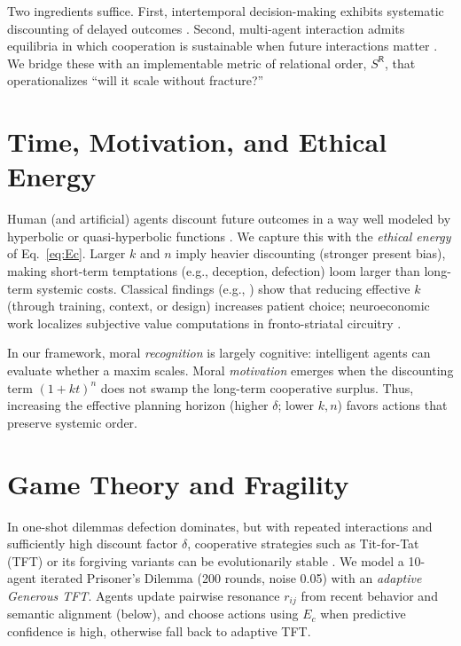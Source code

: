\documentclass[11pt]{article}
\begin{document}
Two ingredients suffice. First, intertemporal decision-making exhibits systematic discounting of delayed outcomes \cite{Ainslie1975,Frederick2002,KableGlimcher2007}. Second, multi-agent interaction admits equilibria in which cooperation is sustainable when future interactions matter \cite{Axelrod1984,Nowak2006,MaynardSmith1982}. We bridge these with an implementable metric of relational order, $S^{\mathsf{R}}$, that operationalizes ``will it scale without fracture?''

\section{Time, Motivation, and Ethical Energy}
Human (and artificial) agents discount future outcomes in a way well modeled by hyperbolic or quasi-hyperbolic functions \cite{Ainslie1975,Frederick2002}. We capture this with the \emph{ethical energy} of Eq.~\ref{eq:Ec}. Larger $k$ and $n$ imply heavier discounting (stronger present bias), making short-term temptations (e.g., deception, defection) loom larger than long-term systemic costs. Classical findings (e.g., \cite{Mischel1989}) show that reducing effective $k$ (through training, context, or design) increases patient choice; neuroeconomic work localizes subjective value computations in fronto-striatal circuitry \cite{KableGlimcher2007}.

In our framework, moral \emph{recognition} is largely cognitive: intelligent agents can evaluate whether a maxim scales. Moral \emph{motivation} emerges when the discounting term $(1+kt)^n$ does not swamp the long-term cooperative surplus. Thus, increasing the effective planning horizon (higher $\delta$; lower $k,n$) favors actions that preserve systemic order.

\section{Game Theory and Fragility}
In one-shot dilemmas defection dominates, but with repeated interactions and sufficiently high discount factor $\delta$, cooperative strategies such as Tit-for-Tat (TFT) or its forgiving variants can be evolutionarily stable \cite{Axelrod1984,MaynardSmith1982,Nowak2006}. We model a 10-agent iterated Prisoner's Dilemma (200 rounds, noise 0.05) with an \emph{adaptive Generous TFT}. Agents update pairwise resonance $r_{ij}$ from recent behavior and semantic alignment (below), and choose actions using $E_c$ when predictive confidence is high, otherwise fall back to adaptive TFT.
\end{document}
